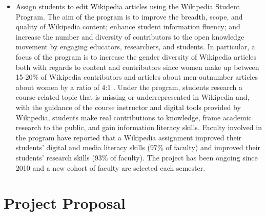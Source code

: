 \documentclass[11pt]{article}
\begin{document}
\begin{itemize}
  \item Assign students to edit Wikipedia articles using the Wikipedia Student Program.  The aim of the program is to improve the breadth, scope, and quality of Wikipedia content; enhance student information fluency; and increase the number and diversity of contributors to the open knowledge movement by engaging educators, researchers, and students. In particular, a focus of the program is to increase the gender diversity of Wikipedia articles both with regards to content and contributors since women make up between 15-20\% of Wikipedia contributors and articles about men outnumber articles about women by a ratio of 4:1 \cite{HC-MS:22}.  Under the program, students research a course-related topic that is missing or underrepresented in Wikipedia and, with the guidance of the course instructor and digital tools provided by Wikipedia, students make real contributions to knowledge, frame academic research to the public, and gain information literacy skills.  Faculty involved in the program have reported that a Wikipedia assignment improved their students' digital and media literacy skills (97\% of faculty) and improved their students' research skills (93\% of faculty).  The project has been ongoing since 2010 and a new cohort of faculty are selected each semester.

  
\end{itemize}

\section{Project Proposal}
\end{document}

